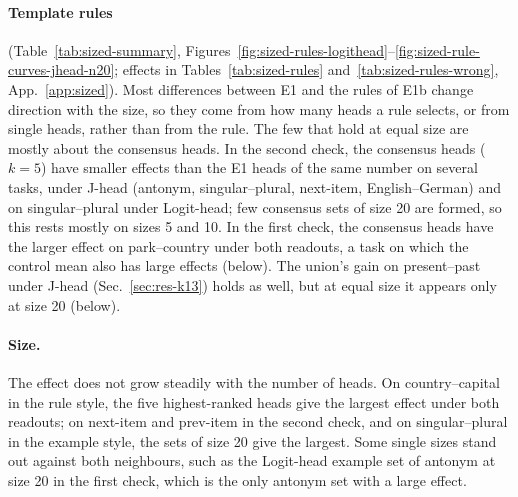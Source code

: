 \documentclass[11pt,a4paper]{article}
\begin{document}
\paragraph{Template rules} (Table~\ref{tab:sized-summary}, Figures~\ref{fig:sized-rules-logithead}--\ref{fig:sized-rule-curves-jhead-n20}; effects in Tables~\ref{tab:sized-rules} and~\ref{tab:sized-rules-wrong}, App.~\ref{app:sized}). Most differences between E1 and the rules of E1b change direction with the size, so they come from how many heads a rule selects, or from single heads, rather than from the rule. The few that hold at equal size are mostly about the consensus heads. In the second check, the consensus heads ($k=5$) have smaller effects than the E1 heads of the same number on several tasks, under J-head (antonym, singular--plural, next-item, English--German) and on singular--plural under Logit-head; few consensus sets of size 20 are formed, so this rests mostly on sizes 5 and 10. In the first check, the consensus heads have the larger effect on park--country under both readouts, a task on which the control mean also has large effects (below). The union's gain on present--past under J-head (Sec.~\ref{sec:res-k13}) holds as well, but at equal size it appears only at size 20 (below).

\paragraph{Size.} The effect does not grow steadily with the number of heads. On country--capital in the rule style, the five highest-ranked heads give the largest effect under both readouts; on next-item and prev-item in the second check, and on singular--plural in the example style, the sets of size 20 give the largest. Some single sizes stand out against both neighbours, such as the Logit-head example set of antonym at size 20 in the first check, which is the only antonym set with a large effect.
\end{document}

